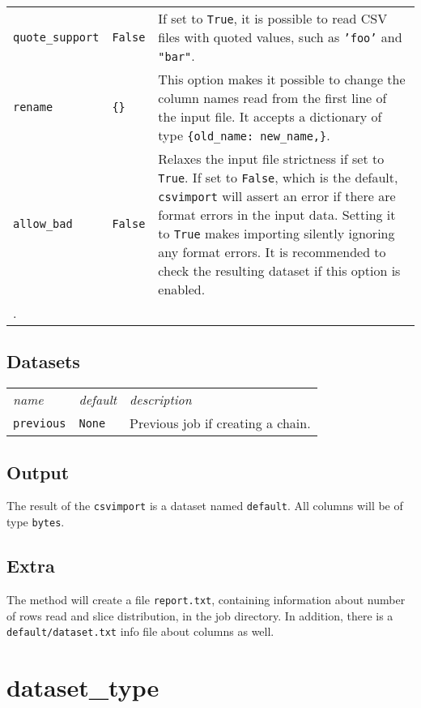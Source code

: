 \begin{tabular}{ p{3.2cm} p{1.8cm} p{10cm}}
  \texttt{quote\_support} & \texttt{False} & If set to \texttt{True},
  it is possible to read CSV files with quoted values, such as
  \texttt{'foo'} and \texttt{"bar"}.\\[1ex]

  \texttt{rename} & \texttt{\{\}} & This option makes it possible to
  change the column names read from the first line of the input file.
  It accepts a dictionary of type
  \texttt{\{old\_name:\ new\_name,\}}.\\[1ex]

  \texttt{allow\_bad} & \texttt{False} & Relaxes the input file
  strictness if set to \texttt{True}.  If set to \texttt{False}, which
  is the default, \texttt{csvimport} will assert an error if there are
  format errors in the input data.  Setting it to \texttt{True} makes
  importing silently ignoring any format errors.  It is recommended to
  check the resulting dataset if this option is enabled.\\[1ex].
\end{tabular}


\subsection{Datasets}
\begin{tabular}{ p{3.2cm} p{1.8cm} p{10cm}}
  \textsl{name} & \textsl{default} & \textsl{description}\\[2ex]
  \texttt{previous} & \texttt{None} & Previous job if creating a chain.
\end{tabular}

\subsection{Output}
The result of the \texttt{csvimport} is a dataset named
\texttt{default}.  All columns will be of type \texttt{bytes}.

\subsection{Extra}
The method will create a file \texttt{report.txt}, containing
information about number of rows read and slice distribution, in the
job directory.  In addition, there is a \texttt{default/dataset.txt}
info file about columns as well.






\clearpage
\section{dataset\_type}

